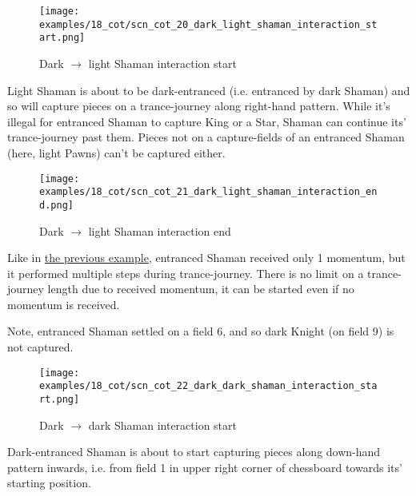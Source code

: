 \noindent
\begin{figure}[!h]
\texttt{[image: examples/18\_cot/scn\_cot\_20\_dark\_light\_shaman\_interaction\_start.png]}
\caption{Dark $\rightarrow$ light Shaman interaction start}
\label{fig:scn_cot_20_dark_light_shaman_interaction_start}
\end{figure}

Light Shaman is about to be dark-entranced (i.e. entranced by dark Shaman) and so will capture
pieces on a trance-journey along right-hand pattern. While it's illegal for entranced Shaman
to capture King or a Star, Shaman can continue its' trance-journey past them. Pieces not on
a capture-fields of an entranced Shaman (here, light Pawns) can't be captured either.

\clearpage %

\noindent
\begin{figure}[!h]
\texttt{[image: examples/18\_cot/scn\_cot\_21\_dark\_light\_shaman\_interaction\_end.png]}
\caption{Dark $\rightarrow$ light Shaman interaction end}
\label{fig:scn_cot_21_dark_light_shaman_interaction_end}
\end{figure}

Like in \hyperref[fig:scn_cot_18_light_light_shaman_interaction_start]{the previous example},
entranced Shaman received only 1 momentum, but it performed multiple steps during trance-journey.
There is no limit on a trance-journey length due to received momentum, it can be started even if
no momentum is received.

Note, entranced Shaman settled on a field 6, and so dark Knight (on field 9) is not captured.

\clearpage %

\noindent
\begin{figure}[!h]
\texttt{[image: examples/18\_cot/scn\_cot\_22\_dark\_dark\_shaman\_interaction\_start.png]}
\caption{Dark $\rightarrow$ dark Shaman interaction start}
\label{fig:scn_cot_22_dark_dark_shaman_interaction_start}
\end{figure}

Dark-entranced Shaman is about to start capturing pieces along down-hand pattern inwards,
i.e. from field 1 in upper right corner of chessboard towards its' starting position.

